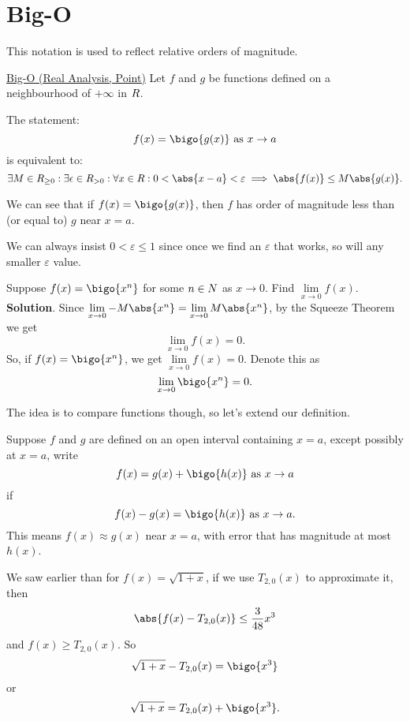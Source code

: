 \section{Big-O}
This notation is used to reflect relative orders of magnitude.
\begin{Definition}{\href{https://proofwiki.org/wiki/Definition:Big-O_Notation/Real/Point}{Big-O (Real Analysis, Point)}}{}
    Let $ f $ and $ g $ be functions
    defined on a neighbourhood of $ +\infty $
    in $ \relax{R} $.

    The statement:
    \[ f(x)=\bigo{g(x)}\text{ as }x\to a \]
    is equivalent to:
    \[ \exists M\in\R_{\ge 0}:
        \exists \epsilon\in\R_{>0}:
        \forall x\in \R:
        0<\abs{x-a}<\varepsilon\implies \abs{f(x)}\le M\abs{g(x)}.  \]
\end{Definition}
We can see that if $ f(x)=\bigo{g(x)} $, then
$ f $ has order of magnitude less than (or equal to) $ g $
near $ x=a $.
\begin{Remark}{}{}
    We can always insist $ 0<\varepsilon\le 1 $
    since once we find an $ \varepsilon $ that works,
    so will any smaller $ \varepsilon $ value.
\end{Remark}
\begin{Example}{}{}
    Suppose $ f(x)=\bigo{x^n} $ for some $ n\in \relax{N} $
    as $ x\to 0 $. Find $ \lim\limits_{{x} \to {0}}f(x) $.
    \tcblower{}
    \textbf{Solution}.
    Since $ \lim\limits_{{x} \to {0}}-M\abs{x^n}=
        \lim\limits_{{x} \to {0}}M\abs{x^n} $, by the
    Squeeze Theorem we get
    \[ \lim\limits_{{x} \to {0}}f(x)=0. \]
    So, if $ f(x)=\bigo{x^n} $, we get
    $ \lim\limits_{{x} \to {0}}f(x)=0 $. Denote this as
    \[ \lim\limits_{{x} \to {0}}\bigo{x^n}=0. \]
\end{Example}
The idea is to compare functions though, so let's extend our
definition.
\begin{Definition}{}{}
    Suppose $ f $ and $ g $ are defined on an open interval
    containing $ x=a $, except possibly at $ x=a $,
    write
    \[ f(x)=g(x)+\bigo{h(x)}\text{ as $x\to a$} \]
    if
    \[ f(x)-g(x)=\bigo{h(x)}\text{ as $x\to a$}. \]
    This means $ f(x)\approx g(x) $ near $ x=a $,
    with error that has magnitude at most $ h(x) $.
\end{Definition}
\begin{Example}{}{}
    We saw earlier than for $ f(x)=\sqrt{1+x} $,
    if we use $ T_{2,0}(x) $ to approximate it, then
    \[ \abs{f(x)-T_{2,0}(x)}\le \frac{3}{48}x^3 \]
    and $ f(x)\ge T_{2,0}(x) $. So
    \[ \sqrt{1+x}-T_{2,0}(x)=\bigo{x^3} \]
    or
    \[ \sqrt{1+x}=T_{2,0}(x)+\bigo{x^3}. \]
\end{Example}
